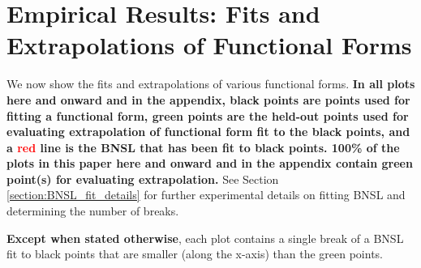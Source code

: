 \documentclass{article} %
\begin{document}




%
\section{Empirical Results: Fits and Extrapolations of Functional Forms}
\vspace{-4.25mm}
\label{section:functional_form_fits}

We now show the fits and extrapolations of various functional forms. \textbf{In all plots here and onward and in the appendix, black points are points used for fitting a functional form, \textcolor{Green3}{green} points are the held-out points used for evaluating extrapolation of functional form fit to the black points, and a \textcolor{red}{red} line is the BNSL that has been fit to black points. 100\% of the plots in this paper here and onward and in the appendix contain \textcolor{Green3}{green} point(s) for evaluating extrapolation.} See Section \ref{section:BNSL_fit_details} for further experimental details on fitting BNSL and determining the number of breaks.

\vspace{-1.95mm}

\textbf{Except when stated otherwise}, each plot contains a single break of a BNSL fit to black points that are smaller (along the x-axis) than the green points.

\vspace{-1.95mm}

\end{document}
